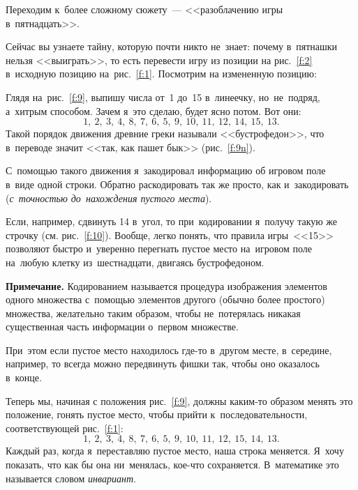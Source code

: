 Переходим к~более сложному сюжету~--- <<разоблачению игры в~пятнадцать>>.

Сейчас вы узнаете тайну, которую почти никто не~знает: почему в~пятнашки нельзя <<выиграть>>,
то есть перевести игру из позиции на рис.~\ref{f:2} в~исходную позицию на~рис.~\ref{f:1}. Посмотрим на измененную позицию:



Глядя на~рис.~\ref{f:9}, выпишу числа от~1 до~15 в~линеечку, но~не~подряд, а~хитрым способом. Зачем
я~это сделаю, будет ясно потом. Вот они:
$$
1, \ 2, \ 3, \ 4, \ 8, \ 7, \ 6, \ 5, \ 9, \ 10, \ 11, \ 12, \ 14, \ 15, \ 13.
$$
Такой порядок движения древние греки называли <<бустрофедон>>, что в~переводе значит <<так, как
пашет бык>> (рис.~\ref{f:9n}).


С~помощью такого движения я~закодировал информацию об игровом поле в~виде одной строки. Обратно
раскодировать так же просто, как и~закодировать (\textit{с~точностью до~нахождения пустого места}).

Если, например, сдвинуть 14 в~угол, то при~кодировании я~получу такую же строчку (см. рис.~\ref{f:10}). Вообще, легко
понять, что правила игры~<<15>> позволяют быстро и~уверенно перегнать пустое место на~игровом поле
на~любую клетку из~шестнадцати, двигаясь бустрофедоном.

\smallskip

\textbf{Примечание.} Кодированием называется процедура изображения элементов одного множества
с~помощью элементов другого (обычно более простого) множества, желательно таким образом, чтобы
не~потерялась никакая существенная часть информации о~первом множестве.

\smallskip


\pagebreak

При~этом если пустое место находилось где-то в~другом месте, в~середине, например, то всегда можно
передвинуть фишки так, чтобы оно оказалось в~конце.

Теперь мы, начиная с положения
рис.~\ref{f:9}, должны каким-то образом менять это положение, гонять пустое место, чтобы прийти
к~последовательности, соответствующей рис.~\ref{f:1}:
$$
1, \ 2, \ 3, \ 4, \ 8, \ 7, \ 6, \ 5, \ 9, \ 10, \ 11, \ 12, \ 15, \ 14, \ 13.
$$
Каждый раз, когда я~переставляю пустое место, наша строка меняется. Я~хочу показать, что как бы она
ни~менялась, кое-что сохраняется. В~математике это называется словом \textit{инвариант}.

